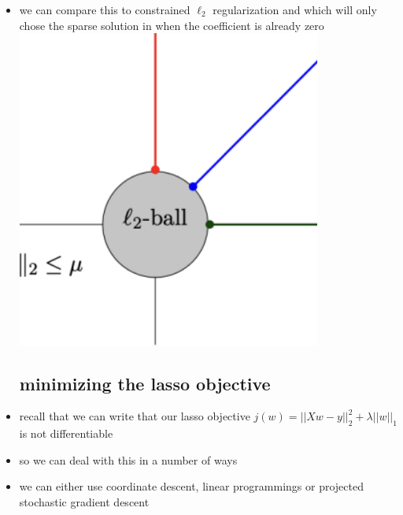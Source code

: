 \documentclass{article}
\begin{document}
\begin{itemize}
\item we can compare this to constrained $\ell_{2}$ regularization and which will only chose the sparse solution in when the coefficient is already zero \\\includegraphics*[width=10cm]{images/Screenshot 2023-05-10 at 10.20.17 PM.png}
\subsection*{minimizing the lasso objective}
\item recall that we can write that our lasso objective $j(w)=||Xw-y||^2_2+\lambda||w||_1$
is not differentiable 
\item so we can deal with this in a number of ways 
\item we can either use coordinate descent, linear programmings or projected stochastic gradient descent

\end{itemize}
\end{document}

